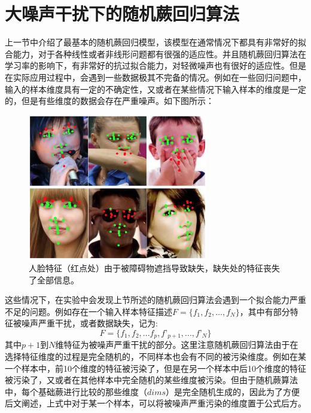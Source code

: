 
\section{大噪声干扰下的随机蕨回归算法}

上一节中介绍了最基本的随机蕨回归模型，该模型在通常情况下都具有非常好的拟合能力，对于各种线性或者非线形问题都有很强的适应性。并且随机蕨回归算法在学习率的影响下，有非常好的抗过拟合能力，对轻微噪声也有很好的适应性。但是在实际应用过程中，会遇到一些数据极其不完备的情况。例如在一些回归问题中，输入的样本维度具有一定的不确定性，又或者在某些情况下输入样本的维度是一定的，但是有些维度的数据会存在严重噪声。如下图所示：

\begin{figure}[htb]
	\centering 
	\includegraphics[width=0.7\textwidth]{./mypic/人脸特征由于被遮挡导致的缺失.jpg} 
	\caption{人脸特征（红点处）由于被障碍物遮挡导致缺失，缺失处的特征丧失了全部信息。} 
\end{figure}

这些情况下，在实验中会发现上节所述的随机蕨回归算法会遇到一个拟合能力严重不足的问题。例如存在一个输入样本特征描述$F=\{f_1,f_2,...,f_N\}$，其中有部分特征被噪声严重干扰，或者数据缺失，记为:
\begin{equation}
F=\{f_1,f_2,...f_p,f’_{p+1},...,f’_N\}
\end{equation}
其中$p+1$到$N$维特征为被噪声严重干扰的部分。这里注意随机蕨回归算法由于在选择特征维度的过程是完全随机的，不同样本也会有不同的被污染维度。例如在某一个样本中，前10个维度的特征被污染了，但是在另一个样本中后10个维度的特征被污染了，又或者在其他样本中完全随机的某些维度被污染。但由于随机蕨算法中，每个基础蕨进行比较的那些维度（$dims$）是完全随机生成的，因此为了方便后文阐述，上式中对于某一个样本，可以将被噪声严重污染的维度置于公式后方。

